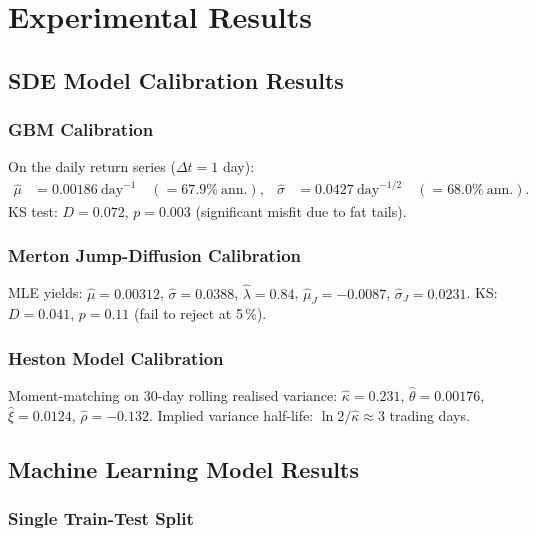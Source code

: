 \documentclass[12pt, a4paper, oneside]{report}
\theoremstyle{plain}
\theoremstyle{definition}
\theoremstyle{remark}
\begin{document}
\chapter{Experimental Results}
\label{ch:results}

\section{SDE Model Calibration Results}

\subsection{GBM Calibration}

On the daily return series ($\Delta t = 1$ day):
\begin{align*}
  \hat\mu &= 0.00186\ \text{day}^{-1}
    \quad (= 67.9\%\ \text{ann.}), &
  \hat\sigma &= 0.0427\ \text{day}^{-1/2}
    \quad (= 68.0\%\ \text{ann.}).
\end{align*}
KS test: $D = 0.072$, $p = 0.003$ (significant misfit due to fat tails).

\subsection{Merton Jump-Diffusion Calibration}

MLE yields:
$\hat\mu = 0.00312$, $\hat\sigma = 0.0388$, $\hat\lambda = 0.84$,
$\hat\mu_J = -0.0087$, $\hat\sigma_J = 0.0231$.
KS: $D = 0.041$, $p = 0.11$ (fail to reject at 5\,\%).

\subsection{Heston Model Calibration}

Moment-matching on 30-day rolling realised variance:
$\hat\kappa = 0.231$, $\hat\theta = 0.00176$, $\hat\xi = 0.0124$, $\hat\rho = -0.132$.
Implied variance half-life: $\ln 2 / \hat\kappa \approx 3$ trading days.

\section{Machine Learning Model Results}

\subsection{Single Train-Test Split}
\end{document}
